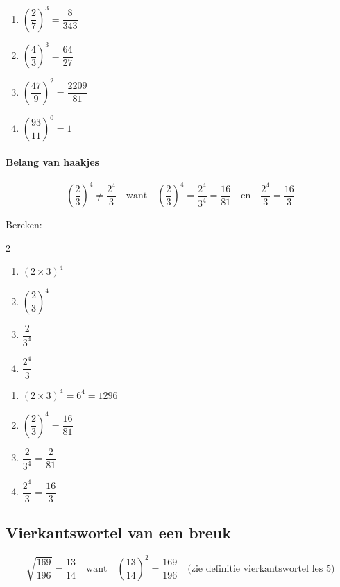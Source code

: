 \documentclass{bis}
\begin{document}
\begin{solution}
  \begin{enumerate}
    \item $\left(\dfrac{2}{7}\right)^3=\dfrac{8}{343}$
    \item $\left(\dfrac{4}{3}\right)^3=\dfrac{64}{27}$
    \item $\left(\dfrac{47}{9}\right)^2=\dfrac{2209}{81}$
    \item $\left(\dfrac{93}{11}\right)^0=1$
  \end{enumerate}
\end{solution}

\paragraph*{Belang van haakjes}
\[\left(\dfrac{2}{3}\right)^4\neq\dfrac{2^4}{3}\quad\text{want}\quad\left(\dfrac{2}{3}\right)^4=\dfrac{2^4}{3^4}=\dfrac{16}{81}\quad\text{en}\quad\dfrac{2^4}{3}=\dfrac{16}{3}\]

\begin{exercise}
Bereken:
\begin{multicols}{2}
  \begin{enumerate}
    \item $(2\times 3)^4$
    \item $\left(\dfrac{2}{3}\right)^4$
    \item $\dfrac{2}{3^4}$
    \item $\dfrac{2^4}{3}$
  \end{enumerate}
\end{multicols}
\end{exercise}

\begin{solution}
  \begin{enumerate}
    \item $(2\times 3)^4=6^4=1296$
    \item $\left(\dfrac{2}{3}\right)^4=\dfrac{16}{81}$
    \item $\dfrac{2}{3^4}=\dfrac{2}{81}$
    \item $\dfrac{2^4}{3}=\dfrac{16}{3}$
  \end{enumerate}
\end{solution}

\subsection{Vierkantswortel van een breuk}

\[\sqrt{\dfrac{169}{196}}=\dfrac{13}{14}\quad\text{want}\quad\left(\dfrac{13}{14}\right)^2=\dfrac{169}{196}\quad\text{(zie definitie vierkantswortel les 5)}\]
\end{document}

